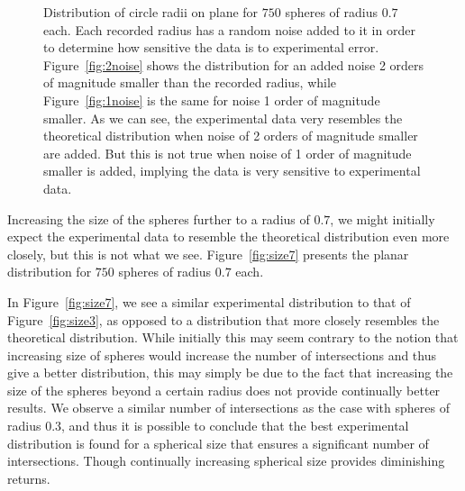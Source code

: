 \documentclass[journal]{IEEEtran}
\begin{document}
\begin{figure}[ht!]
  \centering
  \centering
  \caption{Distribution of circle radii on plane for $750$ spheres of radius $0.7$
    each. Each recorded radius has a random noise added to it in order to
    determine how sensitive the data is to experimental
    error. Figure~\ref{fig:2noise} shows the distribution for an added noise 2
    orders of magnitude smaller than the recorded radius, while
    Figure~\ref{fig:1noise} is the same for noise 1 order of magnitude smaller. As
    we can see, the experimental data very resembles the theoretical
    distribution when noise of 2 orders of magnitude smaller are added. But this
    is not true when noise of 1 order of magnitude smaller is added, implying
    the data is very sensitive to experimental data.}
  \label{fig:noiseplots}
\end{figure}

Increasing the size of the spheres further to a radius of $0.7$, we might
initially expect the experimental data to resemble the theoretical distribution
even more closely, but this is not what we see. Figure~\ref{fig:size7} presents
the planar distribution for $750$ spheres of radius $0.7$ each.

In Figure~\ref{fig:size7}, we see a similar experimental distribution to that of
Figure~\ref{fig:size3}, as opposed to a distribution that more closely resembles
the theoretical distribution. While initially this may seem contrary to the
notion that increasing size of spheres would increase the number of
intersections and thus give a better distribution, this may simply be due to the
fact that increasing the size of the spheres beyond a certain radius does not
provide continually better results. We observe a similar number of intersections
as the case with spheres of radius $0.3$, and thus it is possible to conclude
that the best experimental distribution is found for a spherical size that
ensures a significant number of intersections. Though continually increasing
spherical size provides diminishing returns.
\end{document}
